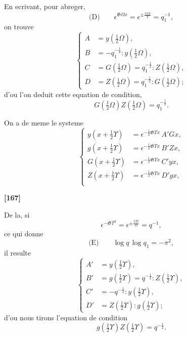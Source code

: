 \documentclass[11pt,a4paper]{article}
\begin{document}
En ecrivant, pour abreger,
\begin{equation*}
\text{(D)}\qquad \epsilon^{\mathfrak{G}\Omega x} = \epsilon^{\pm \frac{\pi\Omega i}{\Upsilon}} = q_1^{-1},
\end{equation*}
on trouve
\begin{equation}
\left\{
\begin{aligned}
A &= y\left(\tfrac{1}{2}\Omega\right),\\
B &= -q_1^{-\frac{1}{2}} : y\left(\tfrac{1}{2}\Omega\right),\\
C &= G\left(\tfrac{1}{2}\Omega\right) = q_1^{-\frac{1}{2}} : Z\left(\tfrac{1}{2}\Omega\right),\\
D &= Z\left(\tfrac{1}{2}\Omega\right) = q_1^{-\frac{1}{2}} : G\left(\tfrac{1}{2}\Omega\right);
\end{aligned}
\right. \tag{23}
\end{equation}
d'ou l'on deduit cette equation de condition,
\begin{equation}
G\left(\tfrac{1}{2}\Omega\right) Z\left(\tfrac{1}{2}\Omega\right) = q_1^{-\frac{1}{2}}. \tag{24}
\end{equation}

On a de meme le systeme
\begin{equation}
\left\{
\begin{aligned}
y\left(x + \tfrac{1}{2}\Upsilon\right) &= \epsilon^{-\frac{1}{2}\mathfrak{G}\Upsilon x}\, A'Gx,\\
g\left(x + \tfrac{1}{2}\Upsilon\right) &= \epsilon^{-\frac{1}{2}\mathfrak{G}\Upsilon x}\, B'Zx,\\
G\left(x + \tfrac{1}{2}\Upsilon\right) &= \epsilon^{-\frac{1}{2}\mathfrak{G}\Upsilon x}\, C'yx,\\
Z\left(x + \tfrac{1}{2}\Upsilon\right) &= \epsilon^{-\frac{1}{2}\mathfrak{G}\Upsilon x}\, D'gx,\\
\end{aligned}
\right. \tag{25}
\end{equation}


\textbf{[167]}

De la, si
\[\epsilon^{-\mathfrak{G}\Upsilon^2} = \epsilon^{\pm \frac{\pi\Upsilon i}{\Omega}} = q^{-1},\]
ce qui donne
\begin{equation*}
\text{(E)}\qquad \log q\, \log q_1 = -\pi^2,
\end{equation*}
il resulte
\begin{equation}
\left\{
\begin{aligned}
A' &= y\left(\tfrac{1}{2}\Upsilon\right),\\
B' &= g\left(\tfrac{1}{2}\Upsilon\right) = q^{-\frac{1}{2}} : Z\left(\tfrac{1}{2}\Upsilon\right),\\
C' &= -q^{-\frac{1}{2}} : y\left(\tfrac{1}{2}\Upsilon\right),\\
D' &= Z\left(\tfrac{1}{2}\Upsilon\right) : g\left(\tfrac{1}{2}\Upsilon\right);
\end{aligned}
\right. \tag{26}
\end{equation}
d'ou nous tirons l'equation de condition
\begin{equation}
g\left(\tfrac{1}{2}\Upsilon\right) Z\left(\tfrac{1}{2}\Upsilon\right) = q^{-\frac{1}{2}}. \tag{27}
\end{equation}
\end{document}
